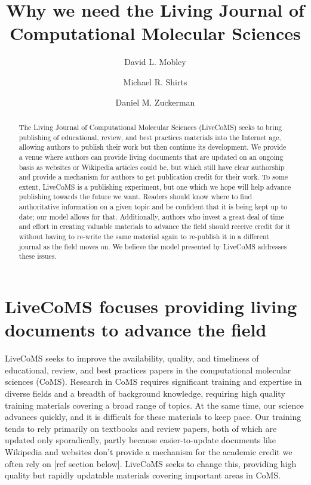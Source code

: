 \documentclass[9pt]{livecoms}
\title{Why we need the Living Journal of Computational Molecular Sciences}
\author[1*]{David L. Mobley}
\author[2*]{Michael R. Shirts}
\author[3*]{Daniel M. Zuckerman}
\affil[1]{Department of Pharmaceutical Sciences and Chemistry, University of California, Irvine}
\affil[2]{Department of Chemical and Biological Engineering, University of Colorado Boulder}
\affil[2]{Department of Biomedical Engineering, Oregon Health Sciences University}
\begin{document}
\maketitle

\begin{abstract}
The Living Journal of Computational Molecular Sciences (LiveCoMS) seeks to bring publishing of educational, review, and best practices materials into the Internet age, allowing authors to publish their work but then continue its development.
We provide a venue where authors can provide living documents that are updated on an ongoing basis as websites or Wikipedia articles could be, but which still have clear authorship and provide a mechanism for authors to get publication credit for their work.
To some extent, LiveCoMS is a publishing experiment, but one which we hope will help advance publishing towards the future we want.
Readers should know where to find authoritative information on a given topic and be confident that it is being kept up to date; our model allows for that. 
Additionally, authors who invest a great deal of time and effort in creating valuable materials to advance the field should receive credit for it without having to re-write the same material again to re-publish it in a different journal as the field moves on. 
We believe the model presented by LiveCoMS addresses these issues.
\end{abstract}


\section{LiveCoMS focuses providing living documents to advance the field}

LiveCoMS seeks to improve the availability, quality, and timeliness of educational, review, and best practices papers in the computational molecular sciences (CoMS).
Research in CoMS requires significant training and expertise in diverse fields and a breadth of background knowledge, requiring high quality training materials covering a broad range of topics.
At the same time, our science advances quickly, and it is difficult for these materials to keep pace. 
Our training tends to rely primarily on textbooks and review papers, both of which are updated only sporadically, partly because easier-to-update documents like Wikipedia and websites don't provide a mechanism for the academic credit we often rely on [ref section below].
LiveCoMS seeks to change this, providing high quality but rapidly updatable materials covering important areas in CoMS.
\end{document}
